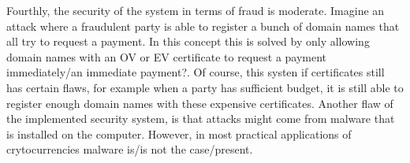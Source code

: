 Fourthly, the security of the system in terms of fraud is moderate. Imagine an attack where a fraudulent party is able to register a bunch of domain names that all try to request a payment. In this concept this is solved by only allowing domain names with an OV or EV certificate to request a payment immediately/an immediate payment?. Of course, this systen if certificates still has certain flaws, for example when a party has sufficient budget, it is still able to register enough domain names with these expensive certificates. Another flaw of the implemented security system, is that attacks might come from malware that is installed on the computer. However, in most practical applications of crytocurrencies malware is/is not the case/present.

